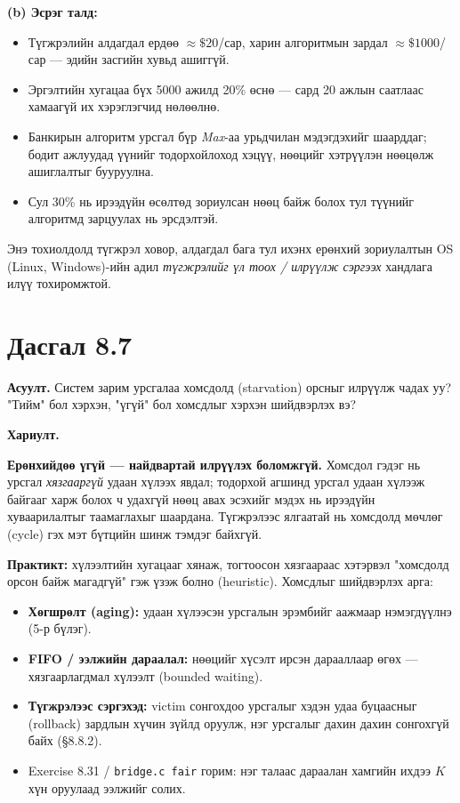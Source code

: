 \documentclass[12pt,a4paper]{article}
\newcommand{\question}[2]{\section{Дасгал #1}\textbf{Асуулт.} #2\par\medskip\textbf{Хариулт.}\par}
\begin{document}
\textbf{(b) Эсрэг талд:}
\begin{itemize}[leftmargin=1.5em]
  \item Түгжрэлийн алдагдал ердөө $\approx\$20$/сар, харин алгоритмын зардал $\approx\$1000$/сар — эдийн засгийн хувьд ашиггүй.
  \item Эргэлтийн хугацаа бүх 5000 ажилд 20\% өснө — сард 20 ажлын саатлаас хамаагүй их хэрэглэгчид нөлөөлнө.
  \item Банкирын алгоритм урсгал бүр \textit{Max}-аа урьдчилан мэдэгдэхийг шаарддаг; бодит ажлуудад үүнийг тодорхойлоход хэцүү, нөөцийг хэтрүүлэн нөөцөлж ашиглалтыг бууруулна.
  \item Сул 30\% нь ирээдүйн өсөлтөд зориулсан нөөц байж болох тул түүнийг алгоритмд зарцуулах нь эрсдэлтэй.
\end{itemize}
Энэ тохиолдолд түгжрэл ховор, алдагдал бага тул ихэнх ерөнхий зориулалтын OS (Linux, Windows)-ийн адил \emph{түгжрэлийг үл тоох / илрүүлж сэргээх} хандлага илүү тохиромжтой.

\question{8.7}{Систем зарим урсгалаа хомсдолд (starvation) орсныг илрүүлж чадах уу? "Тийм" бол хэрхэн, "үгүй" бол хомсдлыг хэрхэн шийдвэрлэх вэ?}

\textbf{Ерөнхийдөө үгүй — найдвартай илрүүлэх боломжгүй.} Хомсдол гэдэг нь урсгал \emph{хязгааргүй} удаан хүлээх явдал; тодорхой агшинд урсгал удаан хүлээж байгааг харж болох ч удахгүй нөөц авах эсэхийг мэдэх нь ирээдүйн хуваарилалтыг таамаглахыг шаардана. Түгжрэлээс ялгаатай нь хомсдолд мөчлөг (cycle) гэх мэт бүтцийн шинж тэмдэг байхгүй.

\textbf{Практикт:} хүлээлтийн хугацааг хянаж, тогтоосон хязгаараас хэтэрвэл "хомсдолд орсон байж магадгүй" гэж үзэж болно (heuristic). Хомсдлыг шийдвэрлэх арга:
\begin{itemize}[leftmargin=1.5em]
  \item \textbf{Хөгшрөлт (aging):} удаан хүлээсэн урсгалын эрэмбийг аажмаар нэмэгдүүлнэ (5-р бүлэг).
  \item \textbf{FIFO / ээлжийн дараалал:} нөөцийг хүсэлт ирсэн дарааллаар өгөх — хязгаарлагдмал хүлээлт (bounded waiting).
  \item \textbf{Түгжрэлээс сэргэхэд:} victim сонгохдоо урсгалыг хэдэн удаа буцаасныг (rollback) зардлын хүчин зүйлд оруулж, нэг урсгалыг дахин дахин сонгохгүй байх (§8.8.2).
  \item Exercise 8.31 / \texttt{bridge.c fair} горим: нэг талаас дараалан хамгийн ихдээ $K$ хүн оруулаад ээлжийг солих.
\end{itemize}
\end{document}
